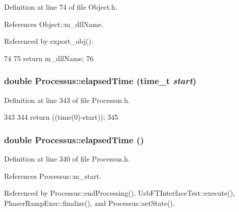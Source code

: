 Definition at line 74 of file Object.h.

References Object::m\_\-dllName.

Referenced by export\_\-obj().


\begin{DoxyCode}
74                        {
75     return m_dllName;
76   }  
\end{DoxyCode}
\hypertarget{classProcessus_a06d3815ad56593dfd0d3c1f534f8b146}{
\subsubsection[{elapsedTime}]{\setlength{\rightskip}{0pt plus 5cm}double Processus::elapsedTime (time\_\-t {\em start})}}
\label{classProcessus_a06d3815ad56593dfd0d3c1f534f8b146}


Definition at line 343 of file Processus.h.


\begin{DoxyCode}
343                                    {
344     return ((time(0)-start));
345   }
\end{DoxyCode}
\hypertarget{classProcessus_aecca96218c65bc805c988cd95447df55}{
\subsubsection[{elapsedTime}]{\setlength{\rightskip}{0pt plus 5cm}double Processus::elapsedTime ()}}
\label{classProcessus_aecca96218c65bc805c988cd95447df55}


Definition at line 340 of file Processus.h.

References Processus::m\_\-start.

Referenced by Processus::endProcessing(), UsbFTInterfaceTest::execute(), PhaserRampExec::finalize(), and Processus::setState().


